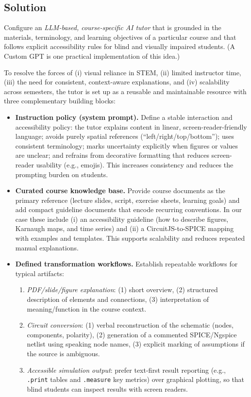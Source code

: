 \subsection*{Solution}

\begin{sol}
Configure an \emph{LLM-based, course-specific AI tutor} that is grounded in the materials, terminology, and learning objectives of a particular course and that follows explicit accessibility rules for blind and visually impaired students. (A Custom GPT is one practical implementation of this idea.)
\end{sol}

To resolve the forces of (i) visual reliance in STEM, (ii) limited instructor time, (iii) the need for consistent, context-aware explanations, and (iv) scalability across semesters, the tutor is set up as a reusable and maintainable resource with three complementary building blocks:

\begin{itemize}
    \item \textbf{Instruction policy (system prompt).} Define a stable interaction and accessibility policy: the tutor explains content in linear, screen-reader-friendly language; avoids purely spatial references (``left/right/top/bottom''); uses consistent terminology; marks uncertainty explicitly when figures or values are unclear; and refrains from decorative formatting that reduces screen-reader usability (e.g., emojis). This increases consistency and reduces the prompting burden on students.

    \item \textbf{Curated course knowledge base.} Provide course documents as the primary reference (lecture slides, script, exercise sheets, learning goals) and add compact guideline documents that encode recurring conventions. In our case these include (i) an accessibility guideline (how to describe figures, Karnaugh maps, and time series) and (ii) a CircuitJS-to-SPICE mapping with examples and templates. This supports scalability and reduces repeated manual explanations.

    \item \textbf{Defined transformation workflows.} Establish repeatable workflows for typical artifacts:
    \begin{enumerate}
        \item \emph{PDF/slide/figure explanation}: (1) short overview, (2) structured description of elements and connections, (3) interpretation of meaning/function in the course context.
        \item \emph{Circuit conversion}: (1) verbal reconstruction of the schematic (nodes, components, polarity), (2) generation of a commented SPICE/Ngspice netlist using speaking node names, (3) explicit marking of assumptions if the source is ambiguous.
        \item \emph{Accessible simulation output}: prefer text-first result reporting (e.g., \texttt{.print} tables and \texttt{.measure} key metrics) over graphical plotting, so that blind students can inspect results with screen readers.
    \end{enumerate}
\end{itemize}

